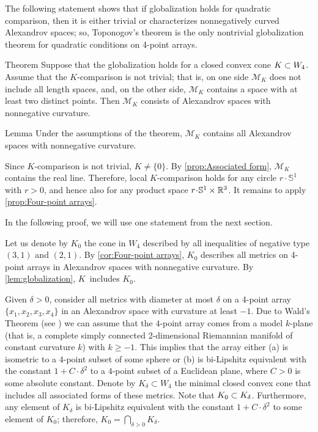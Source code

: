 \documentclass[a4paper,10pt]{article}
\begin{document}
The following statement shows that if globalization holds for quadratic comparison, then it is either trivial or characterizes nonnegatively curved Alexandrov spaces;
so, Toponogov's theorem is the only nontrivial globalization theorem for quadratic conditions on 4-point arrays.

\begin{thm}{Theorem}\label{thm:globalization}
Suppose that the globalization holds for a closed convex cone $K\z\subset W_4$.
Assume that the $K$-comparison is not trivial;
that is, on one side $\mathcal{M}_K$ does not include all length spaces, and, on the other side, $\mathcal{M}_K$ contains a space with at least two distinct points.
Then $\mathcal{M}_K$ consists of Alexandrov spaces with nonnegative curvature.
\end{thm}

\begin{thm}{Lemma}\label{lem:globalization}
Under the assumptions of the theorem, $\mathcal{M}_K$ contains all Alexandrov spaces with nonnegative curvature.
\end{thm}

Since $K$-comparison is not trivial, $K\ne\{0\}$.
By \ref{prop:Associated form}, $\mathcal{M}_K$ contains the real line.
Therefore, local $K$-comparison holds
for any circle $r\cdot \mathbb{S}^1$ with $r>0$, and hence also for any product space $r\cdot \mathbb{S}^1\times\RR^3$.
It remains to apply \ref{prop:Four-point arrays}.
\qeds

In the following proof, we will use one statement from the next section.

Let us denote by $K_0$ the cone in $W_4$ described by all inequalities of negative type $(3,1)$ and $(2,1)$.
By \ref{cor:Four-point arrays}, $K_0$ describes all metrics on 4-point arrays in Alexandrov spaces with nonnegative curvature.
By \ref{lem:globalization},  $K$~includes $K_0$.

Given $\delta>0$, consider all metrics with diameter at most $\delta$ on a 4-point array $\{x_1,x_2,x_3,x_4\}$ in an Alexandrov space with curvature at least $-1$.
Due to Wald's Theorem (see \cite[Exercise 10.7]{AKP-2024}) we can assume that the $4$-point array
comes from a model $k$-plane (that is, a complete simply connected 2-dimensional Riemannian manifold of constant curvature $k$) with $k \ge -1$.
This implies that the array either (a) is isometric to a $4$-point subset of some sphere or (b) is bi-Lipshitz equivalent with the constant $1 + C\cdot \delta^2$ to a $4$-point subset of a Euclidean plane, where $C > 0$ is some absolute constant.
Denote by $K_\delta\subset W_4$ the minimal closed convex cone that includes all associated forms of these metrics.
Note that $K_0\z\subset K_\delta$.
Furthermore, 
any element of $K_\delta$ is bi-Lipshitz equivalent with the constant $1 + C \cdot\delta^2$ to some element of $K_0$;
therefore, $K_0=\bigcap_{\delta>0} K_\delta$.
\end{document}
